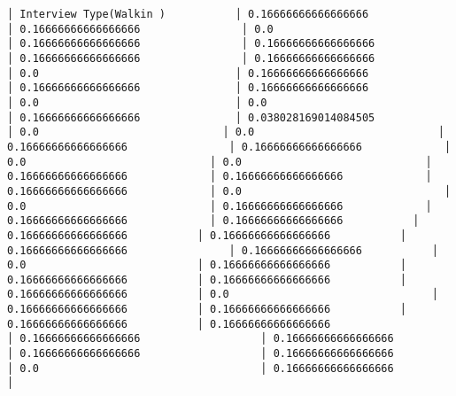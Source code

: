 \documentclass[11pt]{article}
\begin{document}
\begin{Verbatim}[commandchars=\\\{\}]
│ Interview Type(Walkin )           │ 0.16666666666666666                │ 0.16666666666666666                │ 0.0                                │ 0.16666666666666666                │ 0.16666666666666666                │ 0.16666666666666666                │ 0.16666666666666666                │ 0.0                               │ 0.16666666666666666               │ 0.16666666666666666               │ 0.16666666666666666                │ 0.0                               │ 0.0                               │ 0.16666666666666666               │ 0.038028169014084505            │ 0.0                             │ 0.0                             │ 0.16666666666666666                │ 0.16666666666666666             │ 0.0                             │ 0.0                             │ 0.16666666666666666             │ 0.16666666666666666             │ 0.16666666666666666             │ 0.0                                │ 0.0                             │ 0.16666666666666666             │ 0.16666666666666666             │ 0.16666666666666666           │ 0.16666666666666666           │ 0.16666666666666666           │ 0.16666666666666666                │ 0.16666666666666666           │ 0.0                           │ 0.16666666666666666           │ 0.16666666666666666           │ 0.16666666666666666           │ 0.16666666666666666           │ 0.0                                │ 0.16666666666666666           │ 0.16666666666666666           │ 0.16666666666666666           │ 0.16666666666666666                   │ 0.16666666666666666                   │ 0.16666666666666666                   │ 0.16666666666666666                   │ 0.16666666666666666                   │ 0.0                                   │ 0.16666666666666666                   │

\end{Verbatim}
\end{document}
